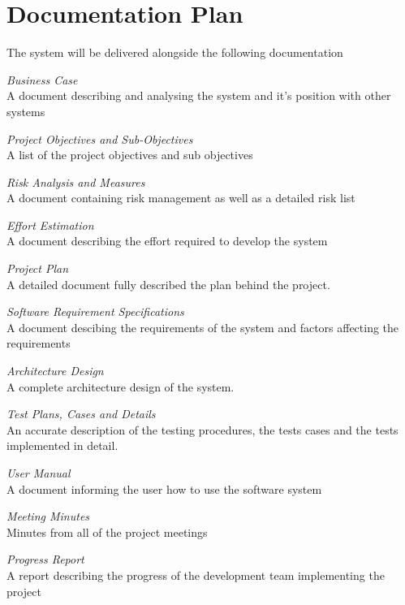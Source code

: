 
\section{Documentation Plan}

The system will be delivered alongside the following documentation

\begin{description}
	\item{\emph{Business Case}} \hfill \\ A document describing and analysing the system and it's position with other systems
	\item{\emph{Project Objectives and Sub-Objectives}} \hfill \\ A list of the project objectives and sub objectives
	\item{\emph{Risk Analysis and Measures}} \hfill \\ A document containing risk management as well as a detailed risk list
	\item{\emph{Effort Estimation}} \hfill \\ A document describing the effort required to develop the system
	\item{\emph{Project Plan}} \hfill \\ A detailed document fully described the plan behind the project.
	\item{\emph{Software Requirement Specifications}} \hfill \\ A document descibing the requirements of the system and factors affecting the requirements
	\item{\emph{Architecture Design}} \hfill \\ A complete architecture design of the system.
	\item{\emph{Test Plans, Cases and Details}} \hfill \\ An accurate description of the testing procedures, the tests cases and the tests implemented in detail.
	\item{\emph{User Manual}} \hfill \\ A document informing the user how to use the software system
	\item{\emph{Meeting Minutes}} \hfill \\ Minutes from all of the project meetings
	\item{\emph{Progress Report}} \hfill \\ A report describing the progress of the development team implementing the project
\end{description}

